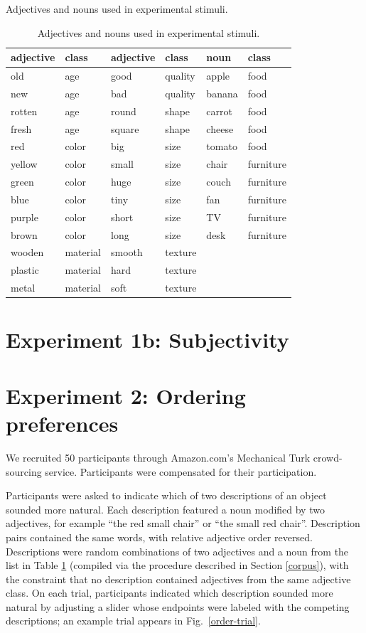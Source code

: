 \documentclass{pnastwo}
\begin{document}
\begin{article}
\begin{materials}
\begin{table}
	\caption{Adjectives and nouns used in experimental stimuli.}
	\begin{tabular}{@{\vrule height 10.5pt depth2pt  width0pt}llllll}
	\textbf{adjective}	&	\textbf{class}	&	\textbf{adjective}	&	\textbf{class}	&	\textbf{noun}	&	\textbf{class}	\\ \hline
old	&	age	&	good	&	quality	&	apple	&	food	\\
new	&	age	&	bad	&	quality	&	banana	&	food	\\
rotten	&	age	&	round	&	shape	&	carrot	&	food	\\
fresh	&	age	&	square	&	shape	&	cheese	&	food	\\
red	&	color	&	big	&	size	&	tomato	&	food	\\
yellow	&	color	&	small	&	size	&	chair	&	furniture	\\
green	&	color	&	huge	&	size	&	couch	&	furniture	\\
blue	&	color	&	tiny	&	size	&	fan	&	furniture	\\
purple	&	color	&	short	&	size	&	TV	&	furniture	\\
brown	&	color	&	long	&	size	&	desk	&	furniture	\\
wooden	&	material	&	smooth	&	texture	\\				
plastic	&	material	&	hard	&	texture	\\				
metal	&	material	&	soft	&	texture	\\													
	\end{tabular} \label{stim-table}\caption{Adjectives and nouns used in experimental stimuli.}
\end{table}

\section{Experiment 1b: Subjectivity}

\section{Experiment 2: Ordering preferences}
We recruited 50 participants through Amazon.com's Mechanical Turk crowd-sourcing service. Participants were compensated for their participation.

Participants were asked to indicate which of two descriptions of an object sounded more natural. Each description featured a noun modified by two adjectives, for example ``the red small chair'' or ``the small red chair''. Description pairs contained the same words, with relative adjective order reversed. Descriptions were random combinations of two adjectives and a noun from the list in Table \ref{stim-table} (compiled via the procedure described in Section \ref{corpus}), with the constraint that no description contained adjectives from the same adjective class.
On each trial, participants indicated which description sounded more natural by adjusting a slider whose endpoints were labeled with the competing descriptions; an example trial appears in Fig.\ \ref{order-trial}.


\end{materials}
\end{article}
\end{document}
